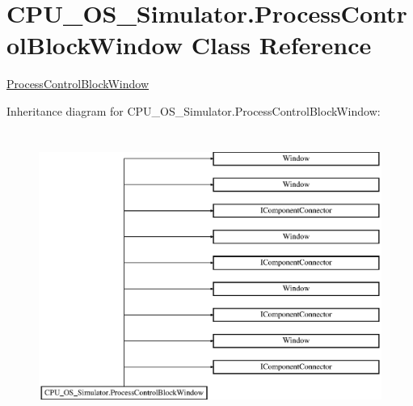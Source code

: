\hypertarget{class_c_p_u___o_s___simulator_1_1_process_control_block_window}{}\section{C\+P\+U\+\_\+\+O\+S\+\_\+\+Simulator.\+Process\+Control\+Block\+Window Class Reference}
\label{class_c_p_u___o_s___simulator_1_1_process_control_block_window}


\hyperlink{class_c_p_u___o_s___simulator_1_1_process_control_block_window}{Process\+Control\+Block\+Window}  


Inheritance diagram for C\+P\+U\+\_\+\+O\+S\+\_\+\+Simulator.\+Process\+Control\+Block\+Window\+:\begin{figure}[H]
\begin{center}
\leavevmode
\includegraphics[height=9.491526cm]{class_c_p_u___o_s___simulator_1_1_process_control_block_window}
\end{center}
\end{figure}
